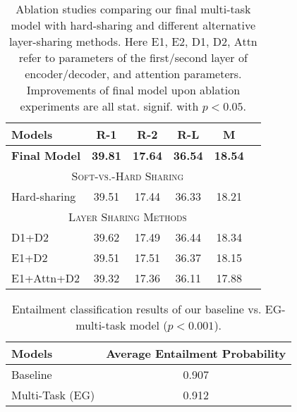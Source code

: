 \documentclass[11pt,a4paper]{article}
\begin{document}
\begin{table}[t]
\begin{center}
\begin{small}
\begin{tabular}{|l|c|c|c|c|c|}
\hline
Models & R-1 & R-2 & R-L & M\\
\hline
\textbf{Final Model} & \textbf{39.81} & \textbf{17.64} & \textbf{36.54} & \textbf{18.54} \\
\hline
\multicolumn{5}{|c|}{\textsc{Soft-vs.-Hard Sharing}}\\
\hline
Hard-sharing & 39.51 & 17.44 & 36.33 & 18.21 \\
\hline
\multicolumn{5}{|c|}{\textsc{Layer Sharing Methods}}\\
\hline
D1+D2 & 39.62 & 17.49 & 36.44 & 18.34 \\
E1+D2 & 39.51 & 17.51 & 36.37 & 18.15 \\
E1+Attn+D2 & 39.32 & 17.36 & 36.11 & 17.88 \\
\hline
\end{tabular}
\end{small}
\end{center}
\vspace{-10pt}
\caption{Ablation studies comparing our final multi-task model with hard-sharing and different alternative layer-sharing methods. Here E1, E2, D1, D2, Attn refer to parameters of the first/second layer of encoder/decoder, and attention parameters. Improvements of final model upon ablation experiments are all stat. signif. with
$p<0.05$.
}
\label{table:ablation-studies}
\end{table}

\begin{table}[t]
\begin{small}
\begin{center}
\begin{tabular}{|l|c|}
\hline
Models & Average Entailment Probability \\
\hline
Baseline &  0.907 \\
Multi-Task (EG) & 0.912 \\
\hline
\end{tabular}
\end{center}
\vspace{-10pt}
\caption{Entailment classification results of our baseline vs. EG-multi-task model ($p<0.001$).}
\label{table:entailment_analysis_results}
\vspace{-5pt}
\end{small}
\end{table}
\end{document}

